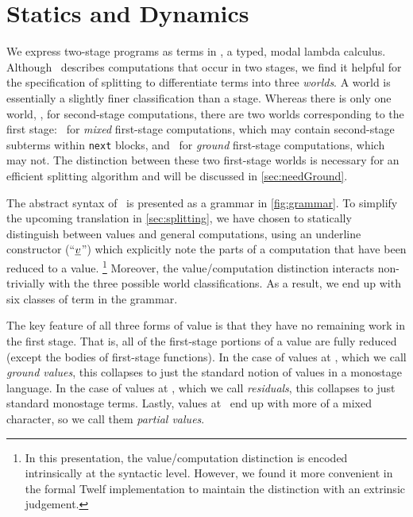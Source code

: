 
\section{\texorpdfstring{\lang}{λ12} Statics and Dynamics}
\label{sec:semantics}



We express two-stage programs as terms in \lang, a typed, modal lambda calculus. 
Although \lang\ describes computations that occur in two stages,
we find it helpful for the specification of splitting to differentiate terms into three \emph{worlds}.
A world is essentially a slightly finer classification than a stage.
Whereas there is only one world, \bbtwo, for second-stage computations,
there are two worlds corresponding to the first stage:
\bbonem\ for \emph{mixed} first-stage computations, which may contain second-stage subterms within {\tt next} blocks,
and \bbonep\ for \emph{ground} first-stage computations, which may not.
The distinction between these two first-stage worlds is necessary for an efficient splitting algorithm
and will be discussed in \ref{sec:needGround}.

The abstract syntax of \lang\ is presented as a grammar in \ref{fig:grammar}.  
To simplify the upcoming translation in \ref{sec:splitting}, 
we have chosen to statically distinguish between values and general computations,
using an underline constructor (``$\underline{\smash{v}}$'') which explicitly note the parts of a computation that have been reduced to a value.
\footnote{In this presentation, the value/computation distinction is encoded intrinsically at the syntactic level.
However, we found it more convenient in the formal Twelf implementation to maintain the distinction with an extrinsic judgement.}
Moreover, the value/computation distinction interacts non-trivially with the three possible world classifications.
As a result, we end up with six classes of term in the grammar.

The key feature of all three forms of value is that they have no remaining work in the first stage.
That is, all of the first-stage portions of a value are fully reduced (except the bodies of first-stage functions).
In the case of values at \bbonep, which we call \emph{ground values}, this collapses to just the standard notion of values in a monostage language.
In the case of values at \bbtwo, which we call \emph{residuals}, this collapses to just standard monostage terms.
Lastly, values at \bbonem\ end up with more of a mixed character, so we call them \emph{partial values}.

